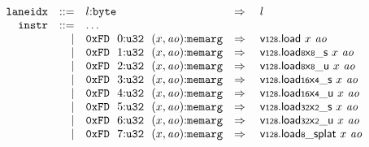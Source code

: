 $$
\begin{array}[t]{@{}lrrl@{}l@{}l@{}l@{}}
& {\mathtt{laneidx}} & ::= & l{:}{\mathtt{byte}} & \quad\Rightarrow\quad{} & l \\
& {\mathtt{instr}} & ::= & \dots \\
& & | & \mathtt{0xFD}~~0{:}{\mathtt{u32}}~~(x, {\mathit{ao}}){:}{\mathtt{memarg}} & \quad\Rightarrow\quad{} & \mathsf{v{\scriptstyle 128}}{.}\mathsf{load}~x~{\mathit{ao}} \\
& & | & \mathtt{0xFD}~~1{:}{\mathtt{u32}}~~(x, {\mathit{ao}}){:}{\mathtt{memarg}} & \quad\Rightarrow\quad{} & {\mathsf{v{\scriptstyle 128}}{.}\mathsf{load}}{{\mathsf{{\scriptstyle 8}}}{\mathsf{x}}{\mathsf{{\scriptstyle 8}}}{\mathsf{\_}}{\mathsf{s}}}~x~{\mathit{ao}} \\
& & | & \mathtt{0xFD}~~2{:}{\mathtt{u32}}~~(x, {\mathit{ao}}){:}{\mathtt{memarg}} & \quad\Rightarrow\quad{} & {\mathsf{v{\scriptstyle 128}}{.}\mathsf{load}}{{\mathsf{{\scriptstyle 8}}}{\mathsf{x}}{\mathsf{{\scriptstyle 8}}}{\mathsf{\_}}{\mathsf{u}}}~x~{\mathit{ao}} \\
& & | & \mathtt{0xFD}~~3{:}{\mathtt{u32}}~~(x, {\mathit{ao}}){:}{\mathtt{memarg}} & \quad\Rightarrow\quad{} & {\mathsf{v{\scriptstyle 128}}{.}\mathsf{load}}{{\mathsf{{\scriptstyle 16}}}{\mathsf{x}}{\mathsf{{\scriptstyle 4}}}{\mathsf{\_}}{\mathsf{s}}}~x~{\mathit{ao}} \\
& & | & \mathtt{0xFD}~~4{:}{\mathtt{u32}}~~(x, {\mathit{ao}}){:}{\mathtt{memarg}} & \quad\Rightarrow\quad{} & {\mathsf{v{\scriptstyle 128}}{.}\mathsf{load}}{{\mathsf{{\scriptstyle 16}}}{\mathsf{x}}{\mathsf{{\scriptstyle 4}}}{\mathsf{\_}}{\mathsf{u}}}~x~{\mathit{ao}} \\
& & | & \mathtt{0xFD}~~5{:}{\mathtt{u32}}~~(x, {\mathit{ao}}){:}{\mathtt{memarg}} & \quad\Rightarrow\quad{} & {\mathsf{v{\scriptstyle 128}}{.}\mathsf{load}}{{\mathsf{{\scriptstyle 32}}}{\mathsf{x}}{\mathsf{{\scriptstyle 2}}}{\mathsf{\_}}{\mathsf{s}}}~x~{\mathit{ao}} \\
& & | & \mathtt{0xFD}~~6{:}{\mathtt{u32}}~~(x, {\mathit{ao}}){:}{\mathtt{memarg}} & \quad\Rightarrow\quad{} & {\mathsf{v{\scriptstyle 128}}{.}\mathsf{load}}{{\mathsf{{\scriptstyle 32}}}{\mathsf{x}}{\mathsf{{\scriptstyle 2}}}{\mathsf{\_}}{\mathsf{u}}}~x~{\mathit{ao}} \\
& & | & \mathtt{0xFD}~~7{:}{\mathtt{u32}}~~(x, {\mathit{ao}}){:}{\mathtt{memarg}} & \quad\Rightarrow\quad{} & {\mathsf{v{\scriptstyle 128}}{.}\mathsf{load}}{{\mathsf{{\scriptstyle 8}}}{\mathsf{\_}}{\mathsf{splat}}}~x~{\mathit{ao}} \\

\end{array}$$
